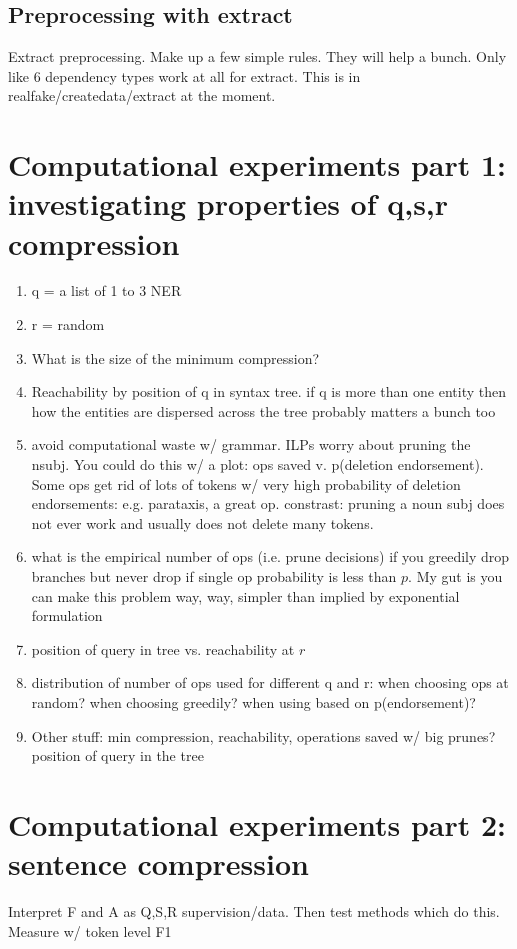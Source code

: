 \documentclass[11pt,a4paper]{article}
\begin{document}
\subsection{Preprocessing with extract}
Extract preprocessing. Make up a few simple rules. They will help a bunch. Only like 6 dependency types work at all for extract. This is in realfake/createdata/extract at the moment.

\section{Computational experiments part 1: investigating properties of q,s,r compression}
\begin{enumerate}
\item{q = a list of 1 to 3 NER}
\item{r = random}
\item{What is the size of the minimum compression?}
\item{Reachability by position of q in syntax tree. if q is more than one entity then how the entities are dispersed across the tree probably matters a bunch too}
\item{avoid computational waste w/ grammar.  ILPs worry about pruning the nsubj. You could do this w/ a plot: ops saved v. p(deletion endorsement). Some ops get rid of lots of tokens w/ very high probability of deletion endorsements: e.g. parataxis, a great op. constrast: pruning a noun subj does not  ever work and usually does not delete many tokens.}
\item{what is the empirical number of ops (i.e. prune decisions) if you greedily drop branches but never drop if single op probability is less than $p$. My gut is you can make this problem way, way, simpler than implied by exponential formulation}
\item{position of query in tree vs. reachability at $r$}
\item{distribution of number of ops used for different q and r: when choosing ops at random? when choosing greedily? when using based on p(endorsement)?}
\item{Other stuff: min compression, reachability, operations saved w/ big prunes? position of query in the tree}
\end{enumerate}

\section{Computational experiments part 2: sentence compression}
Interpret F and A as Q,S,R supervision/data. Then test methods which do this. Measure w/ token level F1
\end{document}
